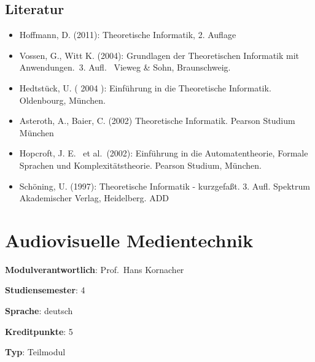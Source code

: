 \hypertarget{literaturpathlabelmi-2017modulbeschreibungen-bachelorba_theoretischeinformatik2}{%
\section*{Literatur\label{/mi-2017/modulbeschreibungen-bachelor/BA_TheoretischeInformatik2}}\label{literaturpathlabelmi-2017modulbeschreibungen-bachelorba_theoretischeinformatik2}}

\begin{itemize}
\tightlist
\item
  Hoffmann, D. (2011): Theoretische Informatik, 2. Auflage
\item
  Vossen, G., Witt K. (2004): Grundlagen der Theoretischen Informatik
  mit Anwendungen.~3. Aufl.~ Vieweg \& Sohn, Braunschweig.
\item
  Hedtstück, U. ( 2004 ): Einführung in die Theoretische Informatik.
  Oldenbourg, München.
\item
  Asteroth, A., Baier, C. (2002) Theoretische Informatik. Pearson
  Studium München
\item
  Hopcroft, J. E.~ et al.~(2002): Einführung in die Automatentheorie,
  Formale Sprachen und Komplexitätstheorie. Pearson Studium, München.
\item
  Schöning, U. (1997): Theoretische Informatik - kurzgefaßt. 3. Aufl.
  Spektrum Akademischer Verlag, Heidelberg. ADD
\end{itemize}

\hypertarget{audiovisuelle-medientechnikpathlabelmi-2017modulbeschreibungen-bachelorba_vc-audiovisuelle-medientechnik}{%
\chapter{Audiovisuelle
Medientechnik\label{/mi-2017/modulbeschreibungen-bachelor/BA_VC-audiovisuelle-medientechnik}}\label{audiovisuelle-medientechnikpathlabelmi-2017modulbeschreibungen-bachelorba_vc-audiovisuelle-medientechnik}}

\begin{modulHead}
\textbf{Modulverantwortlich}: Prof.~Hans
Kornacher
\end{modulHead}
\begin{modulHead}
\textbf{Studiensemester}:
4
\end{modulHead}
\begin{modulHead}
\textbf{Sprache}:
deutsch
\end{modulHead}
\begin{modulHead}
\textbf{Kreditpunkte}:
5
\end{modulHead}
\begin{modulHead}
\textbf{Typ}:
Teilmodul
\end{modulHead}


